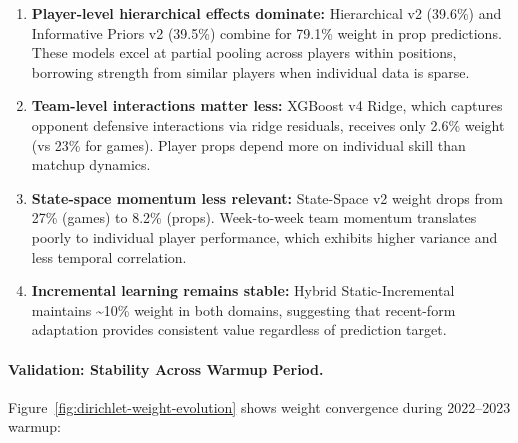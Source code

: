 \begin{enumerate}[itemsep=2pt,parsep=0pt]
    \item \textbf{Player-level hierarchical effects dominate:} Hierarchical v2 (39.6\%) and Informative Priors v2 (39.5\%) combine for 79.1\% weight in prop predictions. These models excel at partial pooling across players within positions, borrowing strength from similar players when individual data is sparse.

    \item \textbf{Team-level interactions matter less:} XGBoost v4 Ridge, which captures opponent defensive interactions via ridge residuals, receives only 2.6\% weight (vs 23\% for games). Player props depend more on individual skill than matchup dynamics.

    \item \textbf{State-space momentum less relevant:} State-Space v2 weight drops from 27\% (games) to 8.2\% (props). Week-to-week team momentum translates poorly to individual player performance, which exhibits higher variance and less temporal correlation.

    \item \textbf{Incremental learning remains stable:} Hybrid Static-Incremental maintains \textasciitilde10\% weight in both domains, suggesting that recent-form adaptation provides consistent value regardless of prediction target.
\end{enumerate}

\paragraph{Validation: Stability Across Warmup Period.}
Figure~\ref{fig:dirichlet-weight-evolution} shows weight convergence during 2022--2023 warmup:

